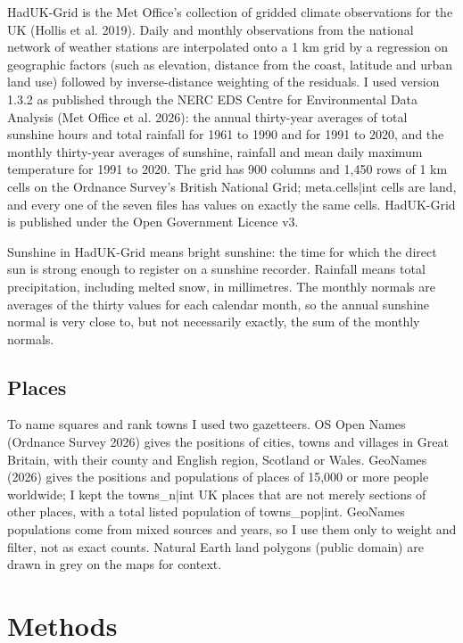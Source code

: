 \documentclass[11pt,a4paper]{article}
\begin{document}
HadUK-Grid is the Met Office's collection of gridded climate observations for the UK (Hollis et al. 2019). Daily and monthly observations from the national network of weather stations are interpolated onto a 1 km grid by a regression on geographic factors (such as elevation, distance from the coast, latitude and urban land use) followed by inverse-distance weighting of the residuals. I used version 1.3.2 as published through the NERC EDS Centre for Environmental Data Analysis (Met Office et al. 2026): the annual thirty-year averages of total sunshine hours and total rainfall for 1961 to 1990 and for 1991 to 2020, and the monthly thirty-year averages of sunshine, rainfall and mean daily maximum temperature for 1991 to 2020. The grid has 900 columns and 1,450 rows of 1 km cells on the Ordnance Survey's British National Grid; {{meta.cells|int}} cells are land, and every one of the seven files has values on exactly the same cells. HadUK-Grid is published under the Open Government Licence v3.

Sunshine in HadUK-Grid means bright sunshine: the time for which the direct sun is strong enough to register on a sunshine recorder. Rainfall means total precipitation, including melted snow, in millimetres. The monthly normals are averages of the thirty values for each calendar month, so the annual sunshine normal is very close to, but not necessarily exactly, the sum of the monthly normals.

\subsection{Places}

To name squares and rank towns I used two gazetteers. OS Open Names (Ordnance Survey 2026) gives the positions of cities, towns and villages in Great Britain, with their county and English region, Scotland or Wales. GeoNames (2026) gives the positions and populations of places of 15,000 or more people worldwide; I kept the {{towns_n|int}} UK places that are not merely sections of other places, with a total listed population of {{towns_pop|int}}. GeoNames populations come from mixed sources and years, so I use them only to weight and filter, not as exact counts. Natural Earth land polygons (public domain) are drawn in grey on the maps for context.

\section{Methods}
\end{document}
